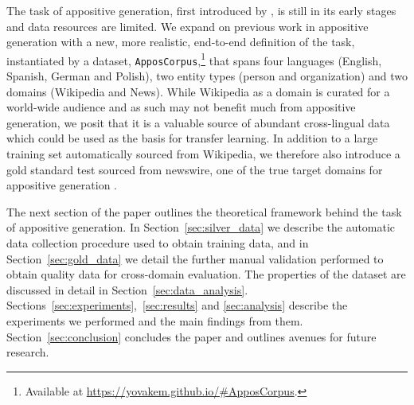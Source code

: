 \documentclass[11pt]{article}
\newcommand{\jttodo}[1]{\todo[color=blue!20]{#1}}
\newcommand{\corpus}{\texttt{ApposCorpus}}
\begin{document}
The task of appositive generation, first introduced by , is still in its early stages and data resources are limited. %
We expand on previous work in appositive generation with a new, more realistic, end-to-end definition of the task, instantiated by a dataset, \corpus,\footnote{Available at \url{https://yovakem.github.io/#ApposCorpus}.} that spans four languages (English, Spanish, German and Polish), two entity types (person and organization) and two domains (Wikipedia and News). While Wikipedia as a domain is curated for a world-wide audience and as such may not benefit much from appositive generation, we posit that it is a valuable source of abundant cross-lingual data which could be used as the basis for transfer learning. In addition to a large training set automatically sourced from Wikipedia, we therefore also introduce a gold standard test sourced from newswire, one of the true target domains for appositive generation \cite{kang2019pomo}. 


The next section of the paper outlines the theoretical framework behind the task of appositive generation. In Section~\ref{sec:silver_data} we describe the automatic data collection procedure used to obtain training data, and in Section~\ref{sec:gold_data} we detail the further manual validation performed to obtain quality data for cross-domain evaluation. The properties of the dataset are discussed in detail in Section~\ref{sec:data_analysis}. Sections~\ref{sec:experiments},~\ref{sec:results} and \ref{sec:analysis} describe the experiments we performed and the main findings from them. Section~\ref{sec:conclusion} concludes the paper and outlines avenues for future research. 
\end{document}
